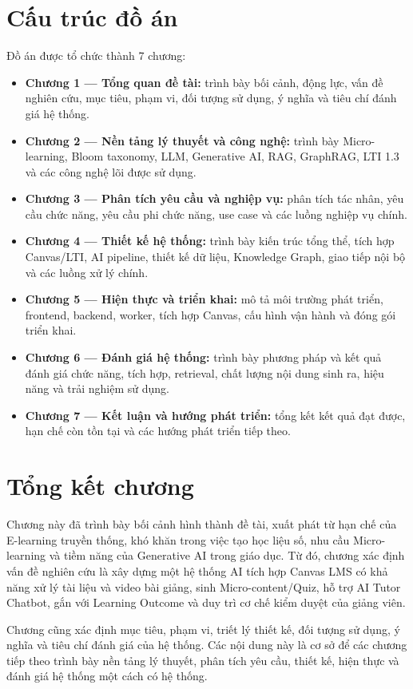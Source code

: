 \section{Cấu trúc đồ án}

Đồ án được tổ chức thành 7 chương:
\begin{itemize}
    \item \textbf{Chương 1 --- Tổng quan đề tài:} trình bày bối cảnh, động lực,
          vấn đề nghiên cứu, mục tiêu, phạm vi, đối tượng sử dụng, ý nghĩa và
          tiêu chí đánh giá hệ thống.
    \item \textbf{Chương 2 --- Nền tảng lý thuyết và công nghệ:} trình bày
          Micro-learning, Bloom taxonomy, LLM, Generative AI, RAG, GraphRAG,
          LTI 1.3 và các công nghệ lõi được sử dụng.
    \item \textbf{Chương 3 --- Phân tích yêu cầu và nghiệp vụ:} phân tích tác
          nhân, yêu cầu chức năng, yêu cầu phi chức năng, use case và các luồng
          nghiệp vụ chính.
    \item \textbf{Chương 4 --- Thiết kế hệ thống:} trình bày kiến trúc tổng
          thể, tích hợp Canvas/LTI, AI pipeline, thiết kế dữ liệu, Knowledge Graph,
          giao tiếp nội bộ và các luồng xử lý chính.
    \item \textbf{Chương 5 --- Hiện thực và triển khai:} mô tả môi trường phát
          triển, frontend, backend, worker, tích hợp Canvas, cấu hình vận hành và
          đóng gói triển khai.
    \item \textbf{Chương 6 --- Đánh giá hệ thống:} trình bày phương pháp và
          kết quả đánh giá chức năng, tích hợp, retrieval, chất lượng nội dung
          sinh ra, hiệu năng và trải nghiệm sử dụng.
    \item \textbf{Chương 7 --- Kết luận và hướng phát triển:} tổng kết kết quả
          đạt được, hạn chế còn tồn tại và các hướng phát triển tiếp theo.
\end{itemize}

\section{Tổng kết chương}

Chương này đã trình bày bối cảnh hình thành đề tài, xuất phát từ hạn chế của
E-learning truyền thống, khó khăn trong việc tạo học liệu số, nhu cầu
Micro-learning và tiềm năng của Generative AI trong giáo dục. Từ đó, chương
xác định vấn đề nghiên cứu là xây dựng một hệ thống AI tích hợp Canvas LMS có
khả năng xử lý tài liệu và video bài giảng, sinh Micro-content/Quiz, hỗ trợ AI
Tutor Chatbot, gắn với Learning Outcome và duy trì cơ chế kiểm duyệt của giảng
viên.

Chương cũng xác định mục tiêu, phạm vi, triết lý thiết kế, đối tượng sử dụng,
ý nghĩa và tiêu chí đánh giá của hệ thống. Các nội dung này là cơ sở để các
chương tiếp theo trình bày nền tảng lý thuyết, phân tích yêu cầu, thiết kế,
hiện thực và đánh giá hệ thống một cách có hệ thống.
